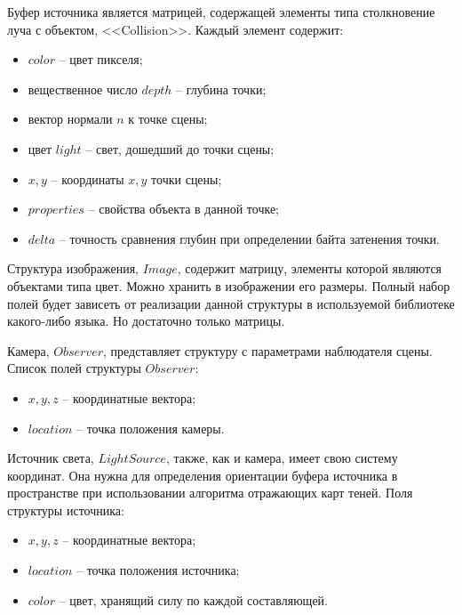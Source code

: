 {    Буфер источника является матрицей, содержащей элементы типа
    столкновение луча с объектом, <<Collision>>.
    Каждый элемент содержит:
    \begin{itemize}
        \item $color$ -- цвет пикселя;
        \item вещественное число $depth$ -- глубина точки;
        \item вектор нормали $n$ к точке сцены;
        \item цвет $light$ -- свет, дошедший до точки сцены;
        \item $x, y$ -- координаты $x, y$ точки сцены;
        \item $properties$ -- свойства объекта в данной точке;
        \item $delta$ -- точность сравнения глубин
        при определении байта затенения точки.
    \end{itemize}
    
    Структура изображения, $Image$, содержит матрицу, элементы
    которой являются объектами типа цвет.
    Можно хранить в изображении его размеры.
    Полный набор полей будет зависеть от реализации данной
    структуры в используемой библиотеке какого-либо языка.
    Но достаточно только матрицы.
    
    Камера, $Observer$, представляет структуру с параметрами наблюдателя сцены.
    Список полей структуры $Observer$:
    \begin{itemize}
        \item $x, y, z$ -- координатные вектора;
        \item $location$ -- точка положения камеры.
    \end{itemize}
    
    Источник света, $LightSource$, также, как и камера,
    имеет свою систему координат.
    Она нужна для определения ориентации буфера источника в пространстве
    при использовании алгоритма отражающих карт теней.
    Поля структуры источника:
    \begin{itemize}
        \item $x, y, z$ -- координатные вектора;
        \item $location$ -- точка положения источника;
        \item $color$ -- цвет, хранящий силу по каждой составляющей.
    \end{itemize}


}
